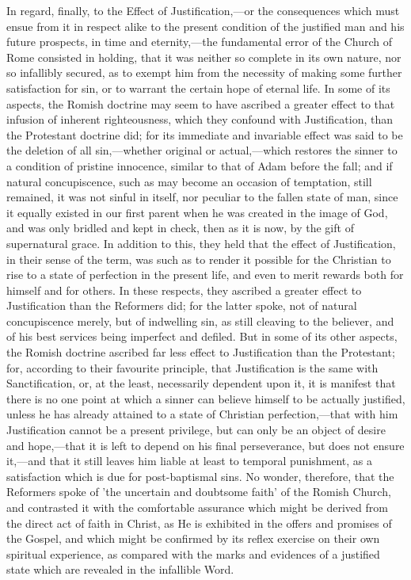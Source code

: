 \documentclass[
]{book}
\begin{document}
In regard, finally, to the Effect of Justification,---or the consequences which must ensue from it in respect alike to the present condition of the justified man and his future prospects, in time and eternity,---the fundamental error of the Church of Rome consisted in holding, that it was neither so complete in its own nature, nor so infallibly secured, as to exempt him from the necessity of making some further satisfaction for sin, or to warrant the certain hope of eternal life. In some of its aspects, the Romish doctrine may seem to have ascribed a greater effect to that infusion of inherent righteousness, which they confound with Justification, than the Protestant doctrine did; for its immediate and invariable effect was said to be the deletion of all sin,---whether original or actual,---which restores the sinner to a condition of pristine innocence, similar to that of Adam before the fall; and if natural concupiscence, such as may become an occasion of temptation, still remained, it was not sinful in itself, nor peculiar to the fallen state of man, since it equally existed in our first parent when he was created in the image of God, and was only bridled and kept in check, then as it is now, by the gift of supernatural grace. In addition to this, they held that the effect of Justification, in their sense of the term, was such as to render it possible for the Christian to rise to a state of perfection in the present life, and even to merit rewards both for himself and for others. In these respects, they ascribed a greater effect to Justification than the Reformers did; for the latter spoke, not of natural concupiscence merely, but of indwelling sin, as still cleaving to the believer, and of his best services being imperfect and defiled. But in some of its other aspects, the Romish doctrine ascribed far less effect to Justification than the Protestant; for, according to their favourite principle, that Justification is the same with Sanctification, or, at the least, necessarily dependent upon it, it is manifest that there is no one point at which a sinner can believe himself to be actually justified, unless he has already attained to a state of Christian perfection,---that with him Justification cannot be a present privilege, but can only be an object of desire and hope,---that it is left to depend on his final perseverance, but does not ensure it,---and that it still leaves him liable at least to temporal punishment, as a satisfaction which is due for post-baptismal sins. No wonder, therefore, that the Reformers spoke of 'the uncertain and doubtsome faith' of the Romish Church, and contrasted it with the comfortable assurance which might be derived from the direct act of faith in Christ, as He is exhibited in the offers and promises of the Gospel, and which might be confirmed by its reflex exercise on their own spiritual experience, as compared with the marks and evidences of a justified state which are revealed in the infallible Word.
\end{document}
